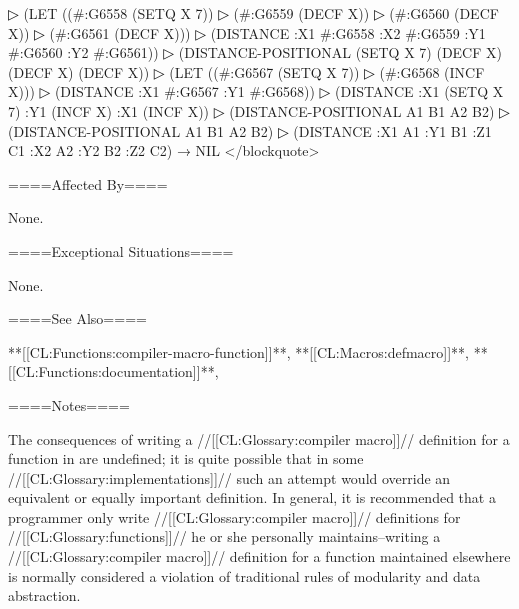 ▷ (LET ((#:G6558 (SETQ X 7))
▷ (#:G6559 (DECF X))
▷ (#:G6560 (DECF X))
▷ (#:G6561 (DECF X)))
▷ (DISTANCE :X1 #:G6558 :X2 #:G6559 :Y1 #:G6560 :Y2 #:G6561))
▷ (DISTANCE-POSITIONAL (SETQ X 7) (DECF X) (DECF X) (DECF X))
▷ (LET ((#:G6567 (SETQ X 7))
▷ (#:G6568 (INCF X)))
▷ (DISTANCE :X1 #:G6567 :Y1 #:G6568))
▷ (DISTANCE :X1 (SETQ X 7) :Y1 (INCF X) :X1 (INCF X))
▷ (DISTANCE-POSITIONAL A1 B1 A2 B2)
▷ (DISTANCE-POSITIONAL A1 B1 A2 B2)
▷ (DISTANCE :X1 A1 :Y1 B1 :Z1 C1 :X2 A2 :Y2 B2 :Z2 C2) → NIL </blockquote>

====Affected By====

None.

====Exceptional Situations====

None.

====See Also====

**[[CL:Functions:compiler-macro-function]]**, **[[CL:Macros:defmacro]]**, **[[CL:Functions:documentation]]**, {\secref\DocVsDecls}

====Notes====

The consequences of writing a //[[CL:Glossary:compiler macro]]// definition for a function in  are undefined; it is quite possible that in some //[[CL:Glossary:implementations]]// such an attempt would override an equivalent or equally important definition. In general, it is recommended that a programmer only write //[[CL:Glossary:compiler macro]]// definitions for //[[CL:Glossary:functions]]// he or she personally maintains--writing a //[[CL:Glossary:compiler macro]]// definition for a function maintained elsewhere is normally considered a violation of traditional rules of modularity and data abstraction.

 
